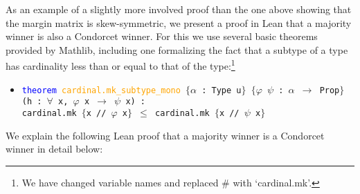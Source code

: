 \documentclass[runningheads]{llncs}
\begin{document}
As an example of a slightly more involved proof than the one above showing that the margin matrix is skew-symmetric, we present a proof in Lean that a majority winner is also a Condorcet winner. For this we use several basic theorems provided by Mathlib, including one formalizing the fact that a subtype of a type has cardinality less than or equal to that of the type:\footnote{We have changed variable names and replaced $\#$ with `cardinal.mk'.}
\begin{itemize}
\item[] \texttt{\textcolor{blue}{theorem} \textcolor{orange}{cardinal.mk\_subtype\_mono} $\{$$\alpha$ : Type u$\}$ $\{$$\varphi$ $\psi$ : $\alpha$ $\to$ Prop$\}$} \\
\texttt{(h : $\forall$ x, $\varphi$ x $\to$ $\psi$ x) :} \\
\texttt{cardinal.mk $\{$x // $\varphi$ x$\}$ $\leq$ cardinal.mk $\{$x // $\psi$ x$\}$}
\end{itemize}
We explain the following Lean proof that a majority winner is a Condorcet winner in detail below:
\end{document}
